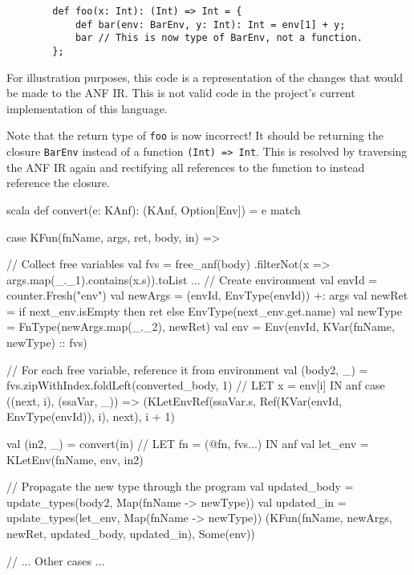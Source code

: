 \begin{tcolorbox}
    \begin{verbatim}
        def foo(x: Int): (Int) => Int = {
            def bar(env: BarEnv, y: Int): Int = env[1] + y;
            bar // This is now type of BarEnv, not a function.
        };
    \end{verbatim}
    \tcblower
    \footnotesize
    For illustration purposes, this code is a representation of the changes that would be made
    to the ANF IR. This is not valid code in the project's current implementation of this language.
\end{tcolorbox}

Note that the return type of \texttt{foo} is now incorrect! It should be returning the closure
\texttt{BarEnv} instead of a function \texttt{(Int) => Int}. This is resolved
by traversing the ANF IR again and rectifying all references to the function to instead reference
the closure.

\begin{code}{scala}
    def convert(e: KAnf): (KAnf, Option[Env]) = e match {
        case KFun(fnName, args, ret, body, in) => {
            // Collect free variables
            val fvs = free_anf(body)
                .filterNot(x => args.map(_._1).contains(x.s)).toList
            ...
            // Create environment
            val envId = counter.Fresh("env")
            val newArgs = (envId, EnvType(envId)) +: args
            val newRet = if next_env.isEmpty then ret else EnvType(next_env.get.name)
            val newType = FnType(newArgs.map(_._2), newRet)
            val env = Env(envId, KVar(fnName, newType) :: fvs)

            // For each free variable, reference it from environment
            val (body2, _) = fvs.zipWithIndex.foldLeft(converted_body, 1) {
                    // LET x = env[i] IN anf
                    case ((next, i), (ssaVar, _)) =>
                        (KLetEnvRef(ssaVar.s, Ref(KVar(envId, EnvType(envId)), i), next), i + 1)
                }

            val (in2, _) = convert(in)
            // LET fn = (@fn, fvs...) IN anf
            val let_env = KLetEnv(fnName, env, in2)

            // Propagate the new type through the program
            val updated_body = update_types(body2, Map(fnName -> newType))
            val updated_in = update_types(let_env, Map(fnName -> newType))
            (KFun(fnName, newArgs, newRet, updated_body, updated_in), Some(env))
        }
    // ... Other cases ...
    }
\end{code}

